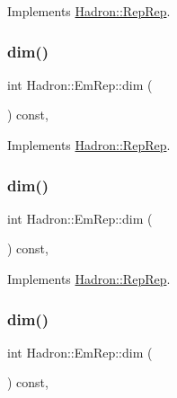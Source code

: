 Implements \mbox{\hyperlink{structHadron_1_1RepRep_a92c8802e5ed7afd7da43ccfd5b7cd92b}{Hadron\+::\+Rep\+Rep}}.

\mbox{\label{structHadron_1_1EmRep_a446425f715385b4b8ac879d3ffec864f}} 
\subsubsection{\texorpdfstring{dim()}{dim()}\hspace{0.1cm}{\footnotesize\ttfamily [3/5]}}
{\footnotesize\ttfamily int Hadron\+::\+Em\+Rep\+::dim (\begin{DoxyParamCaption}{ }\end{DoxyParamCaption}) const\hspace{0.3cm}{\ttfamily [inline]}, {\ttfamily [virtual]}}



Implements \mbox{\hyperlink{structHadron_1_1RepRep_a92c8802e5ed7afd7da43ccfd5b7cd92b}{Hadron\+::\+Rep\+Rep}}.

\mbox{\label{structHadron_1_1EmRep_a446425f715385b4b8ac879d3ffec864f}} 
\subsubsection{\texorpdfstring{dim()}{dim()}\hspace{0.1cm}{\footnotesize\ttfamily [4/5]}}
{\footnotesize\ttfamily int Hadron\+::\+Em\+Rep\+::dim (\begin{DoxyParamCaption}{ }\end{DoxyParamCaption}) const\hspace{0.3cm}{\ttfamily [inline]}, {\ttfamily [virtual]}}



Implements \mbox{\hyperlink{structHadron_1_1RepRep_a92c8802e5ed7afd7da43ccfd5b7cd92b}{Hadron\+::\+Rep\+Rep}}.

\mbox{\label{structHadron_1_1EmRep_a446425f715385b4b8ac879d3ffec864f}} 
\subsubsection{\texorpdfstring{dim()}{dim()}\hspace{0.1cm}{\footnotesize\ttfamily [5/5]}}
{\footnotesize\ttfamily int Hadron\+::\+Em\+Rep\+::dim (\begin{DoxyParamCaption}{ }\end{DoxyParamCaption}) const\hspace{0.3cm}{\ttfamily [inline]}, {\ttfamily [virtual]}}



